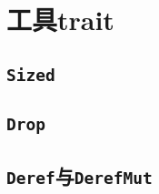 \chapter{工具trait}\label{ch13}

\section{\texttt{Sized}}\label{sized}

\section{\texttt{Drop}}\label{drop}

\section{\texttt{Deref}与\texttt{DerefMut}}\label{deref}
